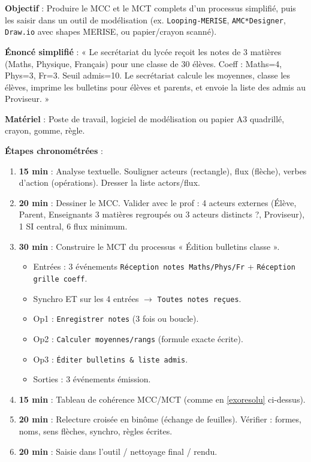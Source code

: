 \documentclass[11pt]{article}
\begin{document}
\begin{experience}
\textbf{Objectif} : Produire le MCC et le MCT complets d'un processus simplifié, puis les saisir dans un outil de modélisation (ex. \texttt{Looping-MERISE}, \texttt{AMC*Designer}, \texttt{Draw.io} avec shapes MERISE, ou papier/crayon scanné).

\textbf{Énoncé simplifié} : « Le secrétariat du lycée reçoit les notes de 3 matières (Maths, Physique, Français) pour une classe de 30 élèves. Coeff : Maths=4, Phys=3, Fr=3. Seuil admis=10. Le secrétariat calcule les moyennes, classe les élèves, imprime les bulletins pour élèves et parents, et envoie la liste des admis au Proviseur. »

\textbf{Matériel} : Poste de travail, logiciel de modélisation ou papier A3 quadrillé, crayon, gomme, règle.

\textbf{Étapes chronométrées} :
\begin{enumerate}
    \item \textbf{15 min} : Analyse textuelle. Souligner acteurs (rectangle), flux (flèche), verbes d'action (opérations). Dresser la liste actors/flux.
    \item \textbf{20 min} : Dessiner le MCC. Valider avec le prof : 4 acteurs externes (Élève, Parent, Enseignants 3 matières regroupés ou 3 acteurs distincts ?, Proviseur), 1 SI central, 6 flux minimum.
    \item \textbf{30 min} : Construire le MCT du processus « Édition bulletins classe ».
        \begin{itemize}
            \item Entrées : 3 événements \texttt{Réception notes Maths/Phys/Fr} + \texttt{Réception grille coeff}.
            \item Synchro ET sur les 4 entrées $\rightarrow$ \texttt{Toutes notes reçues}.
            \item Op1 : \texttt{Enregistrer notes} (3 fois ou boucle).
            \item Op2 : \texttt{Calculer moyennes/rangs} (formule exacte écrite).
            \item Op3 : \texttt{Éditer bulletins \& liste admis}.
            \item Sorties : 3 événements émission.
        \end{itemize}
    \item \textbf{15 min} : Tableau de cohérence MCC/MCT (comme en \ref{exoresolu} ci-dessus).
    \item \textbf{20 min} : Relecture croisée en binôme (échange de feuilles). Vérifier : formes, noms, sens flèches, synchro, règles écrites.
    \item \textbf{20 min} : Saisie dans l'outil / nettoyage final / rendu.
\end{enumerate}


\end{experience}
\end{document}
